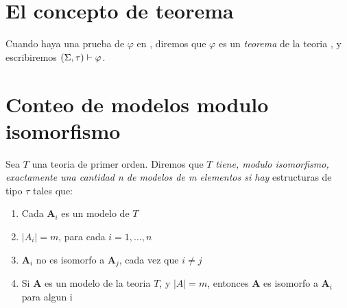 \section{El concepto de teorema}
\begin{definition}
  Cuando haya una prueba de $\varphi$ en \forder, diremos que $\varphi$ es un \emph{teorema} de la teoria \forder, y escribiremos $(\Sigma,\tau)\vdash\varphi$.
\end{definition}

\section{Conteo de modelos modulo isomorfismo}
\begin{definition}
  Sea $T$ una teoria de primer orden. Diremos que $T$ \emph{tiene, modulo isomorfismo, exactamente una 
  cantidad n de modelos de m elementos si hay } estructuras de tipo $\tau$ tales que:
  \begin{enumerate}
    \item Cada $\mathbf{A}_i$ es un modelo de $T$
    \item $|A_i| = m$, para cada $i=1,\dots,n$
    \item $\mathbf{A}_i$ no es isomorfo a $\mathbf{A}_j$, cada vez que $i\neq j$
    \item Si $\mathbf{A}$ es un modelo de la teoria $T$, y $|A| = m$, entonces $\mathbf{A}$ es isomorfo a $\mathbf{A}_i$ para algun i
  \end{enumerate} 
\end{definition}
